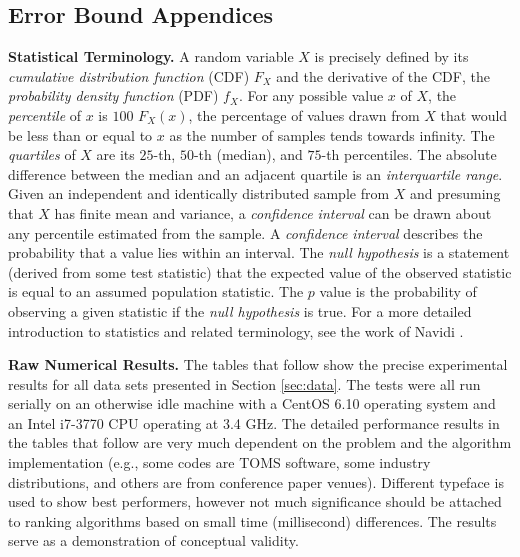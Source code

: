 \documentclass[singlespace,nopageskip]{VTthesis} %
\begin{document}
\begin{appendices}
  \chapter{Error Bound Appendices} \label{app:error}

\begin{normalsize}
\textbf{Statistical Terminology.} A random variable $X$ is precisely
defined by its \textit{cumulative distribution function} (CDF) $F_X$
and the derivative of the CDF, the \textit{probability density
  function} (PDF) $f_X.$ For any possible value $x$ of $X$, the
\textit{percentile} of $x$ is $100$ $F_X(x)$, the percentage of values
drawn from $X$ that would be less than or equal to $x$ as the number
of samples tends towards infinity. The \textit{quartiles} of $X$ are
its $25$-th, $50$-th (median), and $75$-th percentiles. The absolute
difference between the median and an adjacent quartile is an
\textit{interquartile range}. Given an independent and identically
distributed sample from $X$ and presuming that $X$ has finite mean and
variance, a \textit{confidence interval} can be drawn about any
percentile estimated from the sample. A \textit{confidence interval}
describes the probability that a value lies within an interval. The
\textit{null hypothesis} is a statement (derived from some test
statistic) that the expected value of the observed statistic is equal
to an assumed population statistic. The $p$ value is the probability
of observing a given statistic if the \textit{null hypothesis} is
true. For a more detailed introduction to statistics and 
related terminology, see the work of Navidi \cite{navidi_2015}.

\vspace{4mm}
\noindent \textbf{Raw Numerical Results.} The tables that follow show the
precise experimental results for all data sets presented in Section
\ref{sec:data}. The tests were all run serially on an otherwise idle
machine with a CentOS 6.10 operating system and an Intel i7-3770 CPU
operating at 3.4 GHz. The detailed performance results in the tables
that follow are very much dependent on the problem and the algorithm
implementation (e.g., some codes are TOMS software, some industry
distributions, and others are from conference paper venues). Different
typeface is used to show best performers, however not much
significance should be attached to ranking algorithms based on small
time (millisecond) differences. The results serve as a demonstration
of conceptual validity.


\end{normalsize}
\end{appendices}
\end{document}
